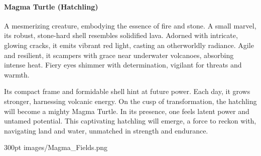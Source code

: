 \documentclass[letterpaper,openany,twoside,twocolumn]{book}
\begin{document}
\paragraph{Magma Turtle (Hatchling)}
A mesmerizing creature, embodying the essence of fire and stone. A small marvel, its robust, stone-hard shell resembles solidified lava. Adorned with intricate, glowing cracks, it emits vibrant red light, casting an otherworldly radiance. Agile and resilient, it scampers with grace near underwater volcanoes, absorbing intense heat. Fiery eyes shimmer with determination, vigilant for threats and warmth.

Its compact frame and formidable shell hint at future power. Each day, it grows stronger, harnessing volcanic energy. On the cusp of transformation, the hatchling will become a mighty Magma Turtle. In its presence, one feels latent power and untamed potential. This captivating \blocktextlinebreak\hspace*{1cm}hatchling will emerge, a force to reckon with, \blocktextlinebreak\hspace*{3cm}navigating land and water, unmatched in \blocktextlinebreak\hspace*{5.5cm}strength and endurance.

\newpage

\MonsterFooterGraphic{50pt}%
	{300pt}%
	{images/Magma_Fields.png}%
	{}%

%
\end{document}
